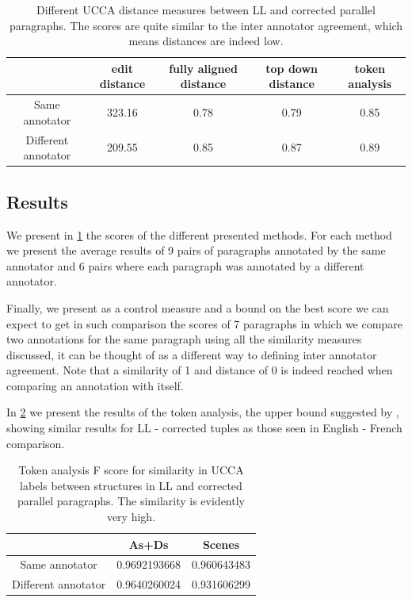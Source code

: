 \documentclass[english]{article}
\begin{document}
\begin{table}[h!]
	\centering
	\label{tab:Distances}
	\begin{tabular}{c|c|c|c|c}
		& edit distance & fully aligned distance & top down distance & token analysis
		\\
		\hline
		Same annotator & 323.16 & 0.78 & 0.79 & 0.85
		\\
		Different annotator & 209.55 & 0.85 & 0.87 & 0.89
		\\
		\end{tabular}
		\caption{Different UCCA distance measures between LL and corrected parallel paragraphs. The scores are quite similar to the inter annotator agreement, which means distances are indeed low.}
	\end{table}
		
	\subsection{Results}
	
	We present in \ref{tab:Distances} the scores of the different presented
	methods. For each method we present the average results of 9 pairs
	of paragraphs annotated by the same annotator and 6 pairs where each
	paragraph was annotated by a different annotator.
	
	Finally, we present as a control measure and a bound on the best score
	we can expect to get in such comparison the scores of 7 paragraphs
	in which we compare two annotations for the same paragraph using all
	the similarity measures discussed, it can be thought of as a different
	way to defining inter annotator agreement. Note that a similarity
	of 1 and distance of 0 is indeed reached when comparing an annotation with itself.
	
	In \ref{tab:Token_analysis} we present the results of the token analysis, the
	upper bound suggested by \cite{sulem2015conceptual}, showing similar
	results for LL - corrected tuples as those seen in English
	- French comparison.
		
		\begin{table}[h!]
			\centering
			\label{tab:Token_analysis}
			\begin{tabular}{c|c|c}
				& As+Ds & Scenes\\
				\hline
				Same annotator & 0.9692193668 & 0.960643483\\
				Different annotator & 0.9640260024
				 & 0.931606299
				 \\
				\end{tabular}
				\caption{Token analysis F score for similarity in UCCA labels between structures in LL and corrected parallel paragraphs. The similarity is evidently very high.}
				\end{table}
				
\end{document}
